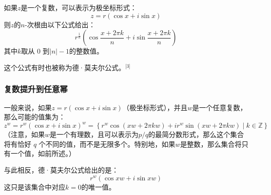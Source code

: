 如果\( z \)是一个复数，可以表示为极坐标形式：
\[
z = r \left( \cos x + i \sin x \right)~
\]
则\( z \)的\( n \)-次根由以下公式给出：
\[
r^{\frac{1}{n}} \left( \cos \frac{x + 2\pi k}{n} + i \sin \frac{x + 2\pi k}{n} \right)~
\]
其中\( k \)取从 0 到\( |n| - 1 \)的整数值。

这个公式有时也被称为德·莫夫尔公式。\(^\text{[3]}\)
\subsubsection{复数提升到任意幂}  
一般来说，如果\(z = r (\cos x + i \sin x)\)（极坐标形式），并且\(w\)是一个任意复数，那么可能的值集为：
\[
z^w = r^w \left( \cos x + i \sin x \right)^w = \left\{ r^w \cos \left( xw + 2\pi kw \right) + i r^w \sin \left( xw + 2\pi kw \right) \mid k \in \mathbb{Z} \right\}~
\]
（注意，如果\( w \)是一个有理数，且可以表示为\(p/q\)的最简分数形式，那么这个集合将有恰好 \( q \) 个不同的值，而不是无限多个。特别地，如果\( w \)是整数，那么集合将只有一个值，如前所述。）  

与此相反，德·莫夫尔公式给出的是：
\[
r^w (\cos xw + i \sin xw)~
\]
这只是该集合中对应\( k = 0 \)的唯一值。